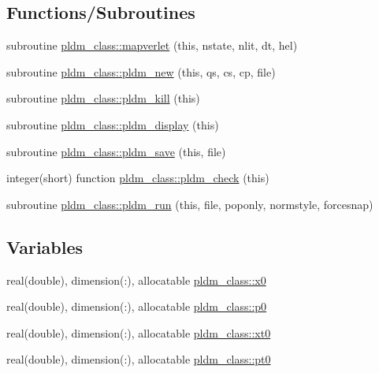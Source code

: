 \subsection*{Functions/\+Subroutines}
\begin{DoxyCompactItemize}
\item 
subroutine \hyperlink{namespacepldm__class_a56bc2a02f61ba7f0ef59c429a9f1e038}{pldm\+\_\+class\+::mapverlet} (this, nstate, nlit, dt, hel)
\item 
subroutine \hyperlink{namespacepldm__class_a12da2274f89c7978903a0e5de4c0a2a7}{pldm\+\_\+class\+::pldm\+\_\+new} (this, qs, cs, cp, file)
\item 
subroutine \hyperlink{namespacepldm__class_ae3cf3688fae95f3ab1729475a8fde0fd}{pldm\+\_\+class\+::pldm\+\_\+kill} (this)
\item 
subroutine \hyperlink{namespacepldm__class_a0b7b20ee63a6203b24c700190738338b}{pldm\+\_\+class\+::pldm\+\_\+display} (this)
\item 
subroutine \hyperlink{namespacepldm__class_aa71a81cb75e284923b6a6f8e4085c564}{pldm\+\_\+class\+::pldm\+\_\+save} (this, file)
\item 
integer(short) function \hyperlink{namespacepldm__class_a87937cd139205ea96672b513c5124b8f}{pldm\+\_\+class\+::pldm\+\_\+check} (this)
\item 
subroutine \hyperlink{namespacepldm__class_acb662f59407b2a0bd62fc36aab876482}{pldm\+\_\+class\+::pldm\+\_\+run} (this, file, poponly, normstyle, forcesnap)
\end{DoxyCompactItemize}
\subsection*{Variables}
\begin{DoxyCompactItemize}
\item 
real(double), dimension(\+:), allocatable \hyperlink{namespacepldm__class_a66ae11e24219b080698059a797561bb4}{pldm\+\_\+class\+::x0}
\item 
real(double), dimension(\+:), allocatable \hyperlink{namespacepldm__class_a4da9c01c7e463087a5f38764804dd0eb}{pldm\+\_\+class\+::p0}
\item 
real(double), dimension(\+:), allocatable \hyperlink{namespacepldm__class_a2f8d09296fcb6d486fb5a87e5a13276b}{pldm\+\_\+class\+::xt0}
\item 
real(double), dimension(\+:), allocatable \hyperlink{namespacepldm__class_a6f0729e807a28fab99053667439c375c}{pldm\+\_\+class\+::pt0}
\end{DoxyCompactItemize}
